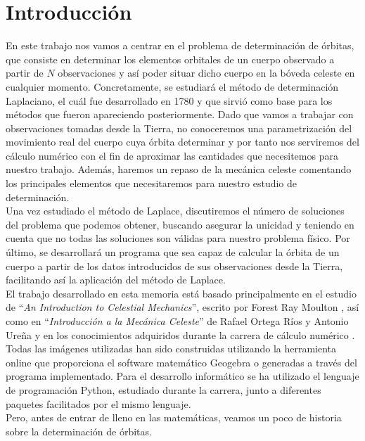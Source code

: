 
\chapter{Introducción}
\label{chap:introduction}
En este trabajo nos vamos a centrar en el problema de determinación de órbitas, que consiste en determinar los elementos orbitales de un cuerpo observado a partir de $N$ observaciones y así poder situar dicho cuerpo en la bóveda celeste en cualquier momento. Concretamente, se estudiará el método de determinación Laplaciano, el cuál fue desarrollado en 1780 y que sirvió como base para los métodos que fueron apareciendo posteriormente.	Dado que vamos a trabajar con observaciones tomadas desde la Tierra, no conoceremos una parametrización del movimiento real del cuerpo cuya órbita determinar y por tanto nos serviremos del cálculo numérico con el fin de aproximar las cantidades que necesitemos para nuestro trabajo. Además, haremos un repaso de la mecánica celeste comentando los principales elementos que necesitaremos para nuestro estudio de determinación.\\

Una vez estudiado el método de Laplace, discutiremos el número de soluciones del problema que podemos obtener, buscando asegurar la unicidad y teniendo en cuenta que no todas las soluciones son válidas para nuestro problema físico. Por último, se desarrollará un programa que sea capaz de calcular la órbita de un cuerpo a partir de los datos introducidos de sus observaciones desde la Tierra, facilitando así la aplicación del método de Laplace.\\

El trabajo desarrollado en esta memoria está basado principalmente en el estudio de ``\textit{An Introduction to Celestial Mechanics}'', escrito por Forest Ray Moulton \cite{moulton}, así como en ``\textit{Introducción a la Mecánica Celeste}'' de Rafael Ortega Ríos y Antonio Ureña \cite{ortega} y en los conocimientos adquiridos durante la carrera de cálculo numérico \cite{MNII}. Todas las imágenes utilizadas han sido construidas utilizando la herramienta online que proporciona el software matemático Geogebra \cite{geogebra} o generadas a través del programa implementado. Para el desarrollo informático se ha utilizado el lenguaje de programación Python, estudiado durante la carrera, junto a diferentes paquetes facilitados por el mismo lenguaje.\\

Pero, antes de entrar de lleno en las matemáticas, veamos un poco de historia sobre la determinación de órbitas.\\



